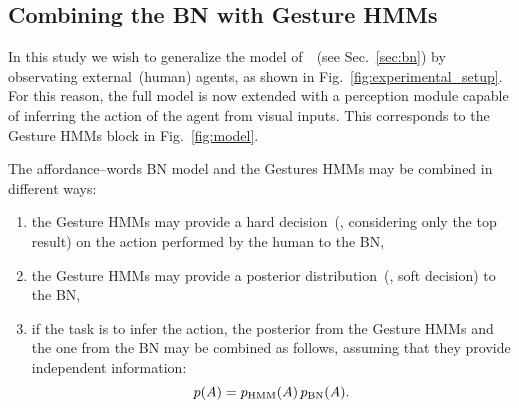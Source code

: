 \subsection{Combining the \acs{BN} with Gesture \acsp{HMM}}

In this study we wish to generalize the model of~\cite{salvi:2012:smcb}~(see Sec.~\ref{sec:bn}) by observating external~(human) agents, as shown in Fig.~\ref{fig:experimental_setup}. For this reason, the full model is now extended with a perception module capable of inferring the action of the agent from visual inputs. This corresponds to the Gesture \acp{HMM} block in Fig.~\ref{fig:model}.

The affordance--words \ac{BN} model and the Gestures \acp{HMM} may be combined in different ways:
\begin{enumerate}
\item the Gesture \acp{HMM} may provide a hard decision~(\ie, considering only the top result) on the action performed by the human to the \ac{BN},

\item the Gesture \acp{HMM} may provide a posterior distribution~(\ie, soft decision) to the \ac{BN},

\item if the task is to infer the action, the posterior from the Gesture \acp{HMM} and the one from the \ac{BN} may be combined as follows, assuming that they provide independent information:
\begin{equation*}
p(A) = p_{\text{HMM}}(A) \, p_{\text{BN}}(A).
\end{equation*}
\end{enumerate}

%

%
%
%

